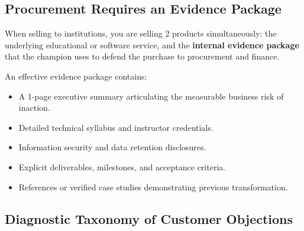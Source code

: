 \subsection{Procurement Requires an Evidence Package}

When selling to institutions, you are selling 2 products simultaneously: the underlying educational or software service, and the \textbf{internal evidence package} that the champion uses to defend the purchase to procurement and finance.

An effective evidence package contains:
\begin{itemize}[leftmargin=1.2em,itemsep=0.2ex]
  \item A 1-page executive summary articulating the measurable business risk of inaction.
  \item Detailed technical syllabus and instructor credentials.
  \item Information security and data retention disclosures.
  \item Explicit deliverables, milestones, and acceptance criteria.
  \item References or verified case studies demonstrating previous transformation.
\end{itemize}

\subsection{Diagnostic Taxonomy of Customer Objections}


